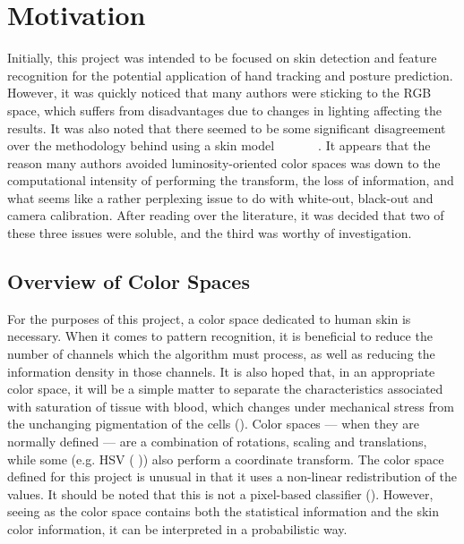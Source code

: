 
\chapter{Motivation}  %

\ifpdf
    \graphicspath{{Chapter1/Figs/Raster/}{Chapter2/Figs/PDF/}{Chapter2/Figs/}}
\else
    \graphicspath{{Chapter1/Figs/Vector/}{Chapter2/Figs/}}
\fi

Initially, this project was intended to be focused on skin detection and feature recognition for the potential application of hand tracking and posture prediction. However, it was quickly noticed that many authors were sticking to the RGB space, which suffers from disadvantages due to changes in lighting affecting the results. It was also noted that there seemed to be some significant disagreement over the methodology behind using a skin model~\cite{Shin2002a}~\cite{Sigal2000a}~\cite{Skarbek1994}~\cite{Soriano2000a}~\cite{Terrillon1999a}~\cite{Vezhnevets2003}~\cite{Brown2001a}. It appears that the reason many authors avoided luminosity-oriented color spaces was down to the computational intensity of performing the transform, the loss of information, and what seems like a rather perplexing issue to do with white-out, black-out and camera calibration. After reading over the literature, it was decided that two of these three issues were soluble, and the third was worthy of investigation.

\section{Overview of Color Spaces}

For the purposes of this project, a color space dedicated to human skin is necessary. When it comes to pattern recognition, it is beneficial to reduce the number of channels which the algorithm must process, as well as reducing the information density in those channels. It is also hoped that, in an appropriate color space, it will be a simple matter to separate the characteristics associated with saturation of tissue with blood, which changes under mechanical stress from the unchanging pigmentation of the cells (\cite{Stamatas2004}). Color spaces --- when they are normally defined --- are a combination of rotations, scaling and translations, while some (e.g. HSV (\cite{Vezhnevets2003, Zarit1999a} )) also perform a coordinate transform. The color space defined for this project is unusual in that it uses a non-linear redistribution of the values. It should be noted that this is not a pixel-based classifier (\cite{Jones2002}). However, seeing as the color space contains both the statistical information and the skin color information, it can be interpreted in a probabilistic way.

